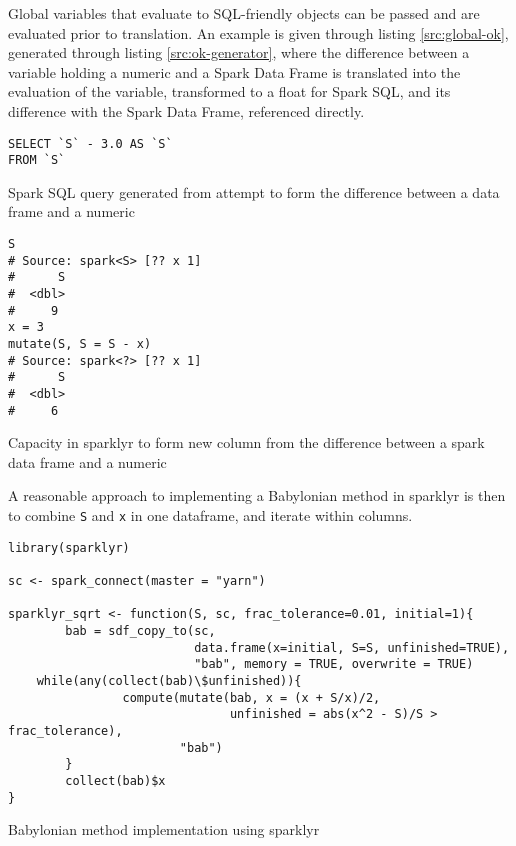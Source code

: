 \documentclass[10pt,a4paper]{article}
\begin{document}
Global variables that evaluate to SQL-friendly objects can be passed and are
evaluated prior to translation.
An example is given through listing \ref{src:global-ok}, generated through
listing \ref{src:ok-generator}, where the difference between a variable holding
a numeric and a Spark Data Frame is translated into the evaluation of the
variable, transformed to a float for Spark SQL, and its difference with the
Spark Data Frame, referenced directly.

\begin{listing}
\begin{verbatim}
SELECT `S` - 3.0 AS `S`
FROM `S`
\end{verbatim}
\caption{Spark SQL query generated from attempt to form the difference between a data frame and a numeric}\label{src:global-ok}
\end{listing}

\begin{listing}
\begin{verbatim}
S
# Source: spark<S> [?? x 1]
#      S
#  <dbl>
#     9
x = 3
mutate(S, S = S - x)
# Source: spark<?> [?? x 1]
#      S
#  <dbl>
#     6
\end{verbatim}
\caption{Capacity in sparklyr to form new column from the difference between a spark data frame and a numeric}\label{src:ok-generator}
\end{listing}

A reasonable approach to implementing a Babylonian method in sparklyr is then
to combine \texttt{S} and \texttt{x} in one dataframe, and iterate within
columns.

\begin{listing}
\begin{verbatim}
library(sparklyr)

sc <- spark_connect(master = "yarn")

sparklyr_sqrt <- function(S, sc, frac_tolerance=0.01, initial=1){
        bab = sdf_copy_to(sc,
                          data.frame(x=initial, S=S, unfinished=TRUE),
                          "bab", memory = TRUE, overwrite = TRUE)
	while(any(collect(bab)\$unfinished)){
                compute(mutate(bab, x = (x + S/x)/2,
                               unfinished = abs(x^2 - S)/S > frac_tolerance),
                        "bab")
        }
        collect(bab)$x
}
\end{verbatim}
\caption{Babylonian method implementation using sparklyr}\label{src:sparklyr-bab}
\end{listing}
\end{document}
